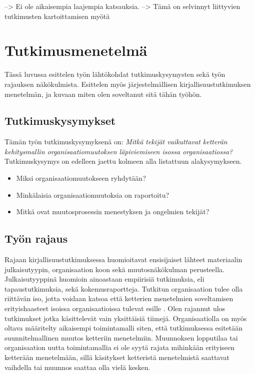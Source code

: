 --> Ei ole aikaisempia laajempia katsauksia.
--> Tämä on selvinnyt liittyvien tutkimusten kartoittamisen myötä



\section{Tutkimusmenetelmä}
\label{sec:menetelma}

Tässä luvussa esittelen työn lähtökohdat tutkimuskysymysten sekä työn rajauksen
näkökulmista. Esittelen myös järjestelmällisen kirjallisuustutkimuksen
menetelmän, ja kuvaan miten olen soveltanut sitä tähän työhön.

\subsection{Tutkimuskysymykset}

Tämän työn tutkimuskysymyksenä on: \textit{Mitkä tekijät vaikuttavat ketterän
kehitysmallin organisaatiomuutoksen läpiviemiseen isossa organisaatiossa?}
Tutkimuskysymys on edelleen jaettu kolmeen alla listattuun alakysymykseen.

\begin{itemize}
\item Miksi organisaatiomuutokseen ryhdytään?
\item Minkälaisia organisaatiomuutoksia on raportoitu?
\item Mitkä ovat muutosprosessin menestyksen ja ongelmien tekijät?
\end{itemize}

\subsection{Työn rajaus}

Rajaan kirjallisuustutkimuksessa huomioitavat ensisijaiset lähteet materiaalin
julkaisutyypin, organisaation koon sekä muutosnäkökulman perusteella.
Julkaisutyyppinä huomioin ainoastaan empiirisiä tutkimuksia, eli
tapaustutkimuksia, sekä kokemusraportteja. Tutkitun organisaation tulee olla
riittävän iso, jotta voidaan katsoa että ketterien menetelmien soveltamisen
erityishaasteet isoissa organisaatioissa tulevat esille \citep{Lindvall2004}.
Olen rajannut ulos tutkimukset jotka käsittelevät vain yksittäisiä tiimejä.
Organisaatiolla on myös oltava määritelty aikaisempi toimintamalli siten, että
tutkimuksessa esitetään suunnitelmallinen muutos ketteriin menetelmiin.
Muunnoksen lopputilaa tai organisaation uutta toimintamallia ei ole syytä rajata
mihinkään erityiseen ketterään menetelmään, sillä käsitykset ketteristä
menetelmistä saattavat vaihdella tai muunnos saattaa olla vielä kesken.


